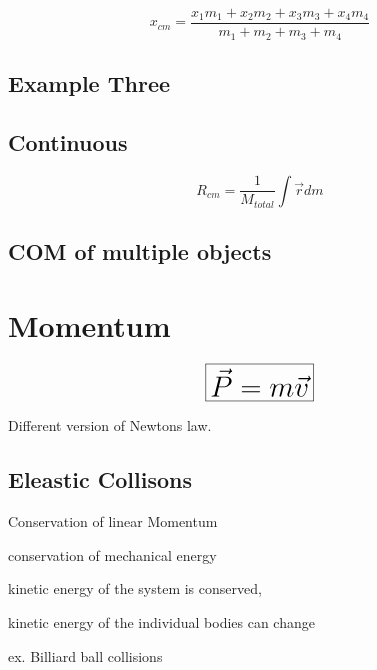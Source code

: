\documentclass{article}
\begin{document}
           \[\boxed{x_{cm} = \frac{x_1m_1 + x_2m_2+ x_3m_3 + x_4m_4}{m_1+ m_2 + m_3 +m_4}}\]


        \subsection{Example Three}

     
        \pagebreak



        \subsection{Continuous}
        \[R_{cm} = \frac{1}{M_{total}} \int \vec{r}dm\]

        \subsection{COM of multiple objects}


    \pagebreak
    \section{Momentum}

    \begin{equation}
        \huge
        \boxed{\vec{P} = m\vec{v}}
    \end{equation}
    
    Different version of Newtons law.
    \subsection{Eleastic Collisons}
        \begin{list}{-}{}
            \item Conservation of linear Momentum
            \item conservation of mechanical energy
            \item kinetic energy of the system is conserved, 
            \item kinetic energy of the individual bodies can change
            \item ex. Billiard ball collisions
        \end{list}
\end{document}
